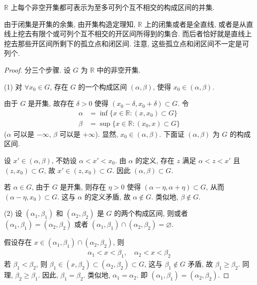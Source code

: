 \documentclass[../../main.tex]{subfiles}
\begin{document}
\begin{theorem}[开集构造定理]\label{theorem:开集构造定理}
$\mathbb{R}$ 上每个非空开集都可表示为至多可列个互不相交的构成区间的并集.
\end{theorem}
\begin{note}
由于闭集是开集的余集, 由开集构造定理知, $\mathbb{R}$ 上的闭集或者是全直线, 或者是从直线上挖去有限个或可列个互不相交的开区间所得到的集合. 而后者恰好就是直线上挖去那些开区间所剩下的孤立点和闭区间. 注意, 这些孤立点和闭区间不一定是可列个. 
\end{note}
\begin{proof}
分三个步骤. 设 $G$ 为 $\mathbb{R}$ 中的非空开集.

(1) 对 $\forall x_0 \in G$, 存在 $G$ 的一个构成区间 $(\alpha, \beta)$, 使得 $x_0 \in (\alpha, \beta)$.

由于 $G$ 是开集, 故存在 $\delta > 0$ 使得 $(x_0 - \delta, x_0 + \delta) \subset G$. 令
\begin{align*}
\alpha &= \inf\{x \in \mathbb{R} : (x, x_0) \subset G\}\\
\beta &= \sup\{x \in \mathbb{R} : (x_0, x) \subset G\}
\end{align*}
($\alpha$ 可以是 $-\infty$, $\beta$ 可以是 $+\infty$). 显然, $x_0 \in (\alpha, \beta)$. 下面证 $(\alpha, \beta)$ 为 $G$ 的构成区间.

设 $x' \in (\alpha, \beta)$, 不妨设 $\alpha < x' < x_0$. 由 $\alpha$ 的定义, 存在 $z$ 满足 $\alpha < z < x'$ 且 $(z, x_0) \subset G$, 故 $x' \in (z, x_0) \subset G$. 因此 $(\alpha, \beta) \subset G$.

若 $\alpha \in G$, 由于 $G$ 是开集, 则存在 $\eta > 0$ 使得 $(\alpha - \eta, \alpha + \eta) \subset G$, 从而 $(\alpha - \eta, x_0) \subset G$. 这与 $\alpha$ 的定义矛盾, 故 $\alpha \notin G$. 类似地, $\beta \notin G$.

(2) 设 $(\alpha_1, \beta_1)$ 和 $(\alpha_2, \beta_2)$ 是 $G$ 的两个构成区间, 则或者 $(\alpha_1, \beta_1) = (\alpha_2, \beta_2)$ 或者 $(\alpha_1, \beta_1) \cap (\alpha_2, \beta_2) = \varnothing$.

假设存在 $x \in (\alpha_1, \beta_1) \cap (\alpha_2, \beta_2)$, 则
\begin{align*}
\alpha_1 < x < \beta_1, \quad \alpha_2 < x < \beta_2
\end{align*}
若 $\beta_1 < \beta_2$, 则 $\beta_1 \in (x, \beta_2) \subset (\alpha_2, \beta_2) \subset G$, 这与 $\beta_1 \notin G$ 矛盾, 故 $\beta_1 \geqslant \beta_2$. 同理, $\beta_2 \geqslant \beta_1$. 因此, $\beta_1 = \beta_2$. 类似地, $\alpha_1 = \alpha_2$. 即 $(\alpha_1, \beta_1) = (\alpha_2, \beta_2)$.


\end{proof}
\end{document}
